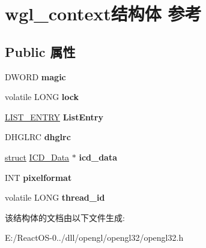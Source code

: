 \hypertarget{structwgl__context}{}\section{wgl\+\_\+context结构体 参考}
\label{structwgl__context}
\subsection*{Public 属性}
\begin{DoxyCompactItemize}
\item 
\mbox{\label{structwgl__context_a06860972f344f2814fe4b26c3540fc49}} 
D\+W\+O\+RD {\bfseries magic}
\item 
\mbox{\label{structwgl__context_a69c9e36774fe14aac8f6908615e8a3d8}} 
volatile L\+O\+NG {\bfseries lock}
\item 
\mbox{\label{structwgl__context_af74228f2f5c37b8a6c43d79d0171ed34}} 
\hyperlink{struct___l_i_s_t___e_n_t_r_y}{L\+I\+S\+T\+\_\+\+E\+N\+T\+RY} {\bfseries List\+Entry}
\item 
\mbox{\label{structwgl__context_a5801583a7c209efbcbaae5b469b1f051}} 
D\+H\+G\+L\+RC {\bfseries dhglrc}
\item 
\mbox{\label{structwgl__context_a97a3cadaf16cbf6cb2c8a15d5f0d8b2f}} 
\hyperlink{interfacestruct}{struct} \hyperlink{struct_i_c_d___data}{I\+C\+D\+\_\+\+Data} $\ast$ {\bfseries icd\+\_\+data}
\item 
\mbox{\label{structwgl__context_ae469e09a8782e9555d4e88a6c0549e66}} 
I\+NT {\bfseries pixelformat}
\item 
\mbox{\label{structwgl__context_af4d8dba1db617377fb9ee19d7978d216}} 
volatile L\+O\+NG {\bfseries thread\+\_\+id}
\end{DoxyCompactItemize}


该结构体的文档由以下文件生成\+:\begin{DoxyCompactItemize}
\item 
E\+:/\+React\+O\+S-\/0../dll/opengl/opengl32/opengl32.\+h\end{DoxyCompactItemize}
